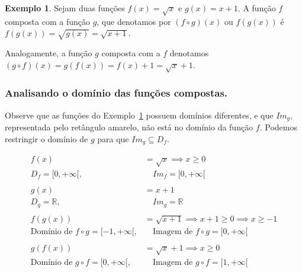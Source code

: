 \documentclass[12pt,openright,twoside,a4paper]{article}
\theoremstyle{definition}
\newtheorem{example}{Exemplo}[section]
\begin{document}
	\begin{example}\label{ex:funcoes_compostas} Sejam duas funções $f(x) = \sqrt{x}$ e $g(x) = x + 1$. A função $f$ composta com a função $g$, que denotamos por $(f \circ g)(x)$ ou $f(g(x))$ é $f(g(x)) = \sqrt{g(x)} = \sqrt{x+1}$.
	
	Analogamente, a função $g$ composta com a $f$ denotamos $(g \circ f)(x) = g(f(x)) = f(x) + 1 = \sqrt{x} + 1$.
	
	\end{example}	
	
	\subsubsection{Analisando o domínio das funções compostas.}
	
	Observe que as funções do Exemplo~\ref{ex:funcoes_compostas} possuem domínios diferentes, e que $Im_g$, representada pelo retângulo amarelo, não está no domínio da função $f$. Podemos restringir o domínio de $g$ para que $Im_g \subseteq D_f$.
	
	\begin{align*}
		f(x) &= \sqrt{x} \implies x \geq 0\\
		D_f = [0, + \infty[,& \quad Im_f = [0, + \infty[\\
		\\
		g(x) &= x + 1\\
		D_g = \mathbb{R},& \quad Im_g = \mathbb{R}\\
		\\
		f(g(x)) &= \sqrt{x + 1} \implies x + 1 \geq 0 \implies x \geq -1\\
		\text{Domínio de } f \circ g = [-1, + \infty[,& \quad \text{Imagem de } f \circ g = [0, + \infty[\\
		\\
		g(f(x)) &= \sqrt{x} + 1 \implies x \geq 0\\
		\text{Domínio de } g \circ f = [0, + \infty[,& \quad \text{Imagem de } g \circ f = [1, + \infty[
	\end{align*}
	
\end{document}
